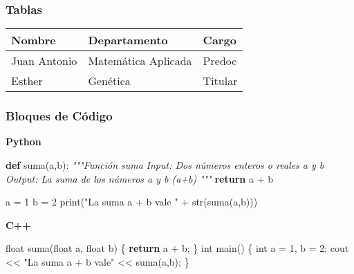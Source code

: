 \documentclass[
]{article}
\newenvironment{Shaded}{}{}
\newcommand{\BuiltInTok}[1]{\textcolor[rgb]{0.00,0.50,0.00}{#1}}
\newcommand{\CommentTok}[1]{\textcolor[rgb]{0.38,0.63,0.69}{\textit{#1}}}
\newcommand{\ControlFlowTok}[1]{\textcolor[rgb]{0.00,0.44,0.13}{\textbf{#1}}}
\newcommand{\DataTypeTok}[1]{\textcolor[rgb]{0.56,0.13,0.00}{#1}}
\newcommand{\DecValTok}[1]{\textcolor[rgb]{0.25,0.63,0.44}{#1}}
\newcommand{\KeywordTok}[1]{\textcolor[rgb]{0.00,0.44,0.13}{\textbf{#1}}}
\newcommand{\NormalTok}[1]{#1}
\newcommand{\OperatorTok}[1]{\textcolor[rgb]{0.40,0.40,0.40}{#1}}
\newcommand{\StringTok}[1]{\textcolor[rgb]{0.25,0.44,0.63}{#1}}
\begin{document}
\subsubsection{Tablas}\label{tablas}

\begin{longtable}[]{@{}lll@{}}
\toprule\noalign{}
\textbf{Nombre} & \textbf{Departamento} & \textbf{Cargo} \\
\midrule\noalign{}
\endhead
\bottomrule\noalign{}
\endlastfoot
Juan Antonio & Matemática Aplicada & Predoc \\
Esther & Genética & Titular \\
\end{longtable}

\subsubsection{Bloques de Código}\label{bloques-de-cuxf3digo}

\textbf{Python}

\begin{Shaded}
\begin{Highlighting}[]
\KeywordTok{def}\NormalTok{ suma(a,b):}
    \CommentTok{"""Función suma}
\CommentTok{        Input: Dos números enteros o reales a y b}
\CommentTok{        Output: La suma de los números a y b (a+b)}
\CommentTok{    """}
    \ControlFlowTok{return}\NormalTok{ a }\OperatorTok{+}\NormalTok{ b}

\NormalTok{a }\OperatorTok{=} \DecValTok{1}
\NormalTok{b }\OperatorTok{=} \DecValTok{2}
\BuiltInTok{print}\NormalTok{(}\StringTok{"La suma a + b vale "} \OperatorTok{+} \BuiltInTok{str}\NormalTok{(suma(a,b)))}
\end{Highlighting}
\end{Shaded}

\textbf{C++}

\begin{Shaded}
\begin{Highlighting}[]
\DataTypeTok{float}\NormalTok{ suma}\OperatorTok{(}\DataTypeTok{float}\NormalTok{ a}\OperatorTok{,} \DataTypeTok{float}\NormalTok{ b}\OperatorTok{)} \OperatorTok{\{}
    \ControlFlowTok{return}\NormalTok{ a }\OperatorTok{+}\NormalTok{ b}\OperatorTok{;}
\OperatorTok{\}}
\DataTypeTok{int}\NormalTok{ main}\OperatorTok{()} \OperatorTok{\{}
    \DataTypeTok{int}\NormalTok{ a }\OperatorTok{=} \DecValTok{1}\OperatorTok{,}\NormalTok{ b }\OperatorTok{=} \DecValTok{2}\OperatorTok{;}
\NormalTok{    cout }\OperatorTok{\textless{}\textless{}} \StringTok{"La suma a + b vale"} \OperatorTok{\textless{}\textless{}}\NormalTok{ suma}\OperatorTok{(}\NormalTok{a}\OperatorTok{,}\NormalTok{b}\OperatorTok{);}
\OperatorTok{\}}
\end{Highlighting}
\end{Shaded}
\end{document}
